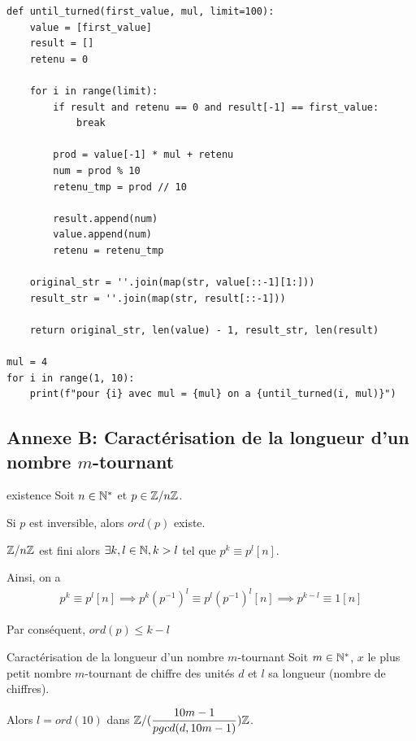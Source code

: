 \documentclass[a4paper,12pt]{article}
\begin{document}
\begin{lstlisting}[breaklines=true]
def until_turned(first_value, mul, limit=100):
    value = [first_value]
    result = []
    retenu = 0
    
    for i in range(limit):
        if result and retenu == 0 and result[-1] == first_value:
            break
            
        prod = value[-1] * mul + retenu
        num = prod % 10
        retenu_tmp = prod // 10
        
        result.append(num)
        value.append(num)
        retenu = retenu_tmp
        
    original_str = ''.join(map(str, value[::-1][1:]))
    result_str = ''.join(map(str, result[::-1]))
    
    return original_str, len(value) - 1, result_str, len(result)

mul = 4
for i in range(1, 10):
    print(f"pour {i} avec mul = {mul} on a {until_turned(i, mul)}")
\end{lstlisting}

\subsection*{Annexe B: Caractérisation de la longueur d'un nombre $m$-tournant}

\begin{lemme}{}{existence}
    Soit $n \in \mathbb{N}^*$ et $p \in \mathbb{Z}/n\mathbb{Z}$.

    Si $p$ est inversible, alors $ord(p)$ existe.
\end{lemme}

\begin{demonstration}
    $\mathbb{Z}/n\mathbb{Z}$ est fini alors $\exists k, l \in \mathbb{N}, k > l$ tel que $p^k \equiv p^l [n]$.
    
    Ainsi, on a
    \begin{align*}        
        p^k \equiv p^l [n] \implies p^k (p^{-1})^l \equiv p^l (p^{-1})^l [n] \implies p^{k-l} \equiv 1 [n]
    \end{align*}

    Par conséquent, $ord(p) \leq k - l$
\end{demonstration}

\begin{theoreme}{Caractérisation de la longueur d'un nombre $m$-tournant}{}
    Soit $m \in \mathbb{N}^*$, $x$ le plus petit nombre $m$-tournant de chiffre des unités $d$ et $l$ sa longueur (nombre de chiffres).

    Alors $l = ord(10)$ dans $\mathbb{Z}/(\dfrac{10m - 1}{pgcd(d, 10m - 1)})\mathbb{Z}$.
\end{theoreme}
\end{document}
